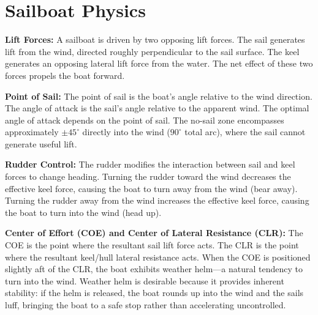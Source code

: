 
\section{Sailboat Physics}
\label{app:sailboat_physics}

\textbf{Lift Forces:} A sailboat is driven by two opposing lift forces. The sail generates lift from the wind, directed roughly perpendicular to the sail surface. The keel generates an opposing lateral lift force from the water. The net effect of these two forces propels the boat forward.

\textbf{Point of Sail:} The point of sail is the boat's angle relative to the wind direction. The angle of attack is the sail's angle relative to the apparent wind. The optimal angle of attack depends on the point of sail. The no-sail zone encompasses approximately $\pm45^{\circ}$ directly into the wind ($90^{\circ}$ total arc), where the sail cannot generate useful lift.

\textbf{Rudder Control:} The rudder modifies the interaction between sail and keel forces to change heading. Turning the rudder toward the wind decreases the effective keel force, causing the boat to turn away from the wind (bear away). Turning the rudder away from the wind increases the effective keel force, causing the boat to turn into the wind (head up).

\textbf{Center of Effort (COE) and Center of Lateral Resistance (CLR):} The COE is the point where the resultant sail lift force acts. The CLR is the point where the resultant keel/hull lateral resistance acts. When the COE is positioned slightly aft of the CLR, the boat exhibits weather helm---a natural tendency to turn into the wind. Weather helm is desirable because it provides inherent stability: if the helm is released, the boat rounds up into the wind and the sails luff, bringing the boat to a safe stop rather than accelerating uncontrolled.

